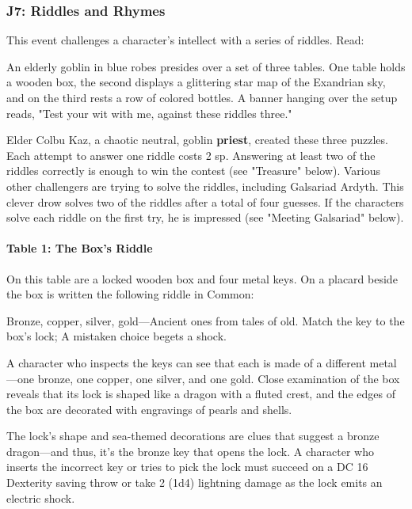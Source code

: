 \documentclass[letterpaper, 11pt, bg=full, twocolumn]{dndbook}
\begin{document}
\subsubsection{J7: Riddles and Rhymes}

This event challenges a character's intellect with a series of riddles. Read:

\begin{DndReadAloud}
An elderly goblin in blue robes presides over a set of three tables. One table holds a wooden box, the second displays a glittering star map of the Exandrian sky, and on the third rests a row of colored bottles. A banner hanging over the setup reads, "Test your wit with me, against these riddles three."
\end{DndReadAloud}

Elder Colbu Kaz, a chaotic neutral, goblin \textbf{priest}, created these three puzzles. Each attempt to answer one riddle costs 2 sp. Answering at least two of the riddles correctly is enough to win the contest (see "Treasure" below). Various other challengers are trying to solve the riddles, including Galsariad Ardyth. This clever drow solves two of the riddles after a total of four guesses. If the characters solve each riddle on the first try, he is impressed (see "Meeting Galsariad" below).

\paragraph{Table 1: The Box's Riddle}

On this table are a locked wooden box and four metal keys. On a placard beside the box is written the following riddle in Common:

\begin{DndReadAloud}
Bronze, copper, silver, gold---Ancient ones from tales of old. Match the key to the box's lock; A mistaken choice begets a shock.
\end{DndReadAloud}

A character who inspects the keys can see that each is made of a different metal---one bronze, one copper, one silver, and one gold. Close examination of the box reveals that its lock is shaped like a dragon with a fluted crest, and the edges of the box are decorated with engravings of pearls and shells.

The lock's shape and sea-themed decorations are clues that suggest a bronze dragon---and thus, it's the bronze key that opens the lock. A character who inserts the incorrect key or tries to pick the lock must succeed on a DC 16 Dexterity saving throw or take 2 (1d4) lightning damage as the lock emits an electric shock.
\end{document}
